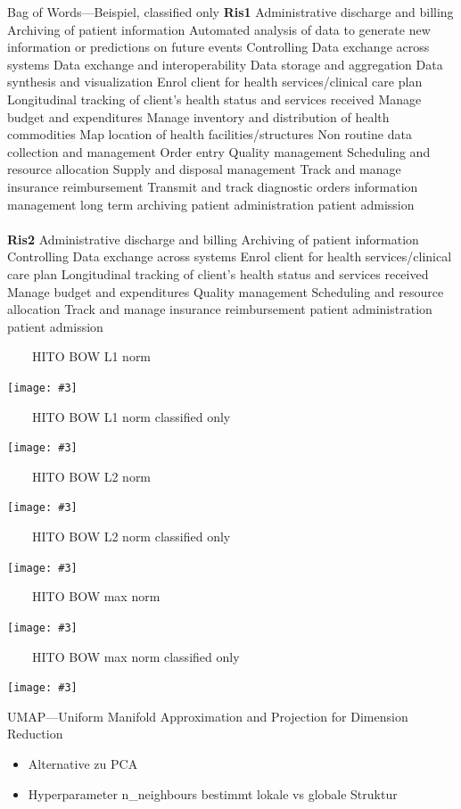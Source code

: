 \documentclass[aspectratio=1610]{beamer}%
\newcommand{\imageslide}[4][]
{
\begin{frame}[plain]{~~~~#2}
\vspace{0.2em}
\begin{center}
\centering\texttt{[image: \#3]}
\end{center}
#1
\note{#4}
\end{frame}
}
\begin{document}
\begin{frame}{Bag of Words---Beispiel, classified only}
\small
\textbf{Ris1} Administrative discharge and billing Archiving of patient information Automated analysis of data to generate new information or predictions on future events Controlling Data exchange across systems Data exchange and interoperability Data storage and aggregation Data synthesis and visualization Enrol client for health services/clinical care plan Longitudinal tracking of client’s health status and services received Manage budget and expenditures Manage inventory and distribution of health commodities Map location of health facilities/structures Non routine data collection and management Order entry Quality management Scheduling and resource allocation Supply and disposal management Track and manage insurance reimbursement Transmit and track diagnostic orders information management long term archiving patient administration patient admission
\\~\\
\textbf{Ris2} Administrative discharge and billing Archiving of patient information Controlling Data exchange across systems Enrol client for health services/clinical care plan Longitudinal tracking of client’s health status and services received Manage budget and expenditures Quality management Scheduling and resource allocation Track and manage insurance reimbursement patient administration patient admission
\end{frame}

\imageslide{HITO BOW L1 norm}{img/cluster-bagofwords-l1.pdf}{}
\imageslide{HITO BOW L1 norm classified only}{img/cluster-bagofwords-classifiedonly-l1.pdf}{}
\imageslide{HITO BOW L2 norm}{img/cluster-bagofwords-l2.pdf}{}
\imageslide{HITO BOW L2 norm classified only}{img/cluster-bagofwords-classifiedonly-l2.pdf}{}
\imageslide{HITO BOW max norm}{img/cluster-bagofwords-max.pdf}{}
\imageslide{HITO BOW max norm classified only}{img/cluster-bagofwords-classifiedonly-max.pdf}{}

\begin{frame}{UMAP---Uniform Manifold Approximation and Projection for Dimension Reduction}
\begin{itemize}
\item Alternative zu PCA
\item Hyperparameter n\_neighbours bestimmt lokale vs globale Struktur
\end{itemize}
\end{frame}
\end{document}
